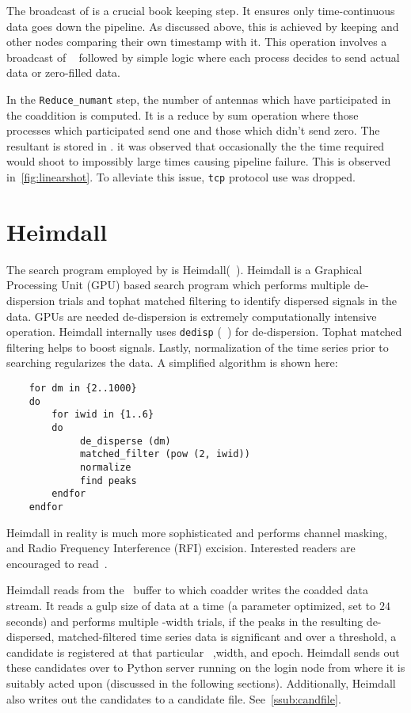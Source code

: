 \par The broadcast of \mjd is a crucial book keeping step. It ensures only time-continuous data goes down the pipeline. 
As discussed above, this is achieved by \root keeping \mjd and other nodes comparing their own timestamp with it.
This operation involves a broadcast of \float~ followed by simple logic where each process decides to send actual data or zero-filled data.

\par In the \texttt{Reduce\_numant} step, the number of antennas which have participated in the coaddition is computed.
It is a reduce by sum operation where those processes which participated send one and those which didn't send zero.
The resultant is stored in \root.
it was observed that occasionally the the time required would shoot to impossibly large times causing pipeline failure.
This is observed in~\autoref{fig:linearshot}.
To alleviate this issue, \texttt{tcp} protocol use was dropped.


\section {Heimdall}

\par The search program employed by \vf is Heimdall(~\cite{heimdall}). 
Heimdall is a Graphical Processing Unit (GPU) based search program which performs multiple de-dispersion trials and tophat matched filtering to identify dispersed signals in the data.
GPUs are needed de-dispersion is extremely computationally intensive operation. 
Heimdall internally uses \texttt{dedisp} (~\cite{dedisp}) for de-dispersion.
Tophat matched filtering helps to boost signals. Lastly, normalization of the time series prior to searching regularizes the data.
A simplified algorithm is shown here:
\begin{verbatim}
	for dm in {2..1000} 
	do
		for iwid in {1..6}
		do
			 de_disperse (dm) 
			 matched_filter (pow (2, iwid))
			 normalize
			 find peaks
		endfor
	endfor
\end{verbatim}

Heimdall in reality is much more sophisticated and performs channel masking, and Radio Frequency Interference (RFI) excision. Interested readers are encouraged to read~\cite{heimdall}.

\par Heimdall reads from the \dada~buffer to which coadder writes the coadded data stream. 
It reads a gulp size of data at a time (a parameter optimized, set to $24$ seconds) and performs multiple
\dm-width trials, if the peaks in the resulting de-dispersed, matched-filtered time series data is significant and over a threshold, 
a candidate is registered at that particular \dm~,width, and epoch.
Heimdall sends out these candidates over to Python server running on the login node from where it is suitably acted upon (discussed in the following sections). 
Additionally, Heimdall also writes out the candidates to a candidate file. See~\autoref{ssub:candfile}.

